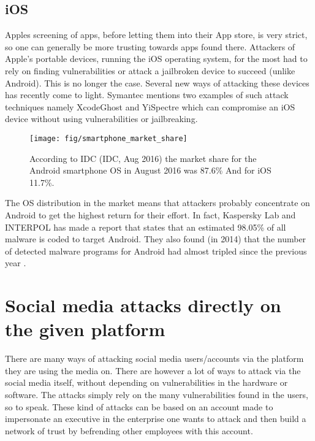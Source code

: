 \subsection{iOS}
Apples screening of apps, before letting them into their App store, is very strict, so one can generally be more trusting towards apps found there. Attackers of Apple’s portable devices, running the iOS operating system, for the most had to rely on finding vulnerabilities or attack a jailbroken device to succeed (unlike Android). This is no longer the case. Several new ways of attacking these devices has recently come to light. Symantec mentions two examples of such attack techniques namely XcodeGhost and YiSpectre which can compromise an iOS device without using vulnerabilities or jailbreaking.
\begin{figure}
\centering
\texttt{[image: fig/smartphone\_market\_share]}
\caption{According to IDC (IDC, Aug 2016) the market share for the Android smartphone OS in August 2016 was 87.6\% And for iOS 11.7\%.\label{fig:smartphone_market_share}}
\end{figure}
The OS distribution in the market means that attackers probably concentrate on Android to get the highest return for their effort. In fact, Kaspersky Lab and INTERPOL has made a report that states that an estimated 98.05\% of all malware is coded to target Android. They also found (in 2014) that the number of detected malware programs for Android had almost tripled since the previous year \cite{Kaspersky2014}. 
\section{Social media attacks directly on the given platform}
There are many ways of attacking social media users/accounts via the platform they are using the media on. There are however a lot of ways to attack via the social media itself, without depending on vulnerabilities in the hardware or software. The attacks simply rely on the many vulnerabilities found in the users, so to speak. These kind of attacks can be based on an account made to impersonate an executive in the enterprise one wants to attack and then build a network of trust by befrending other employees with this account.
